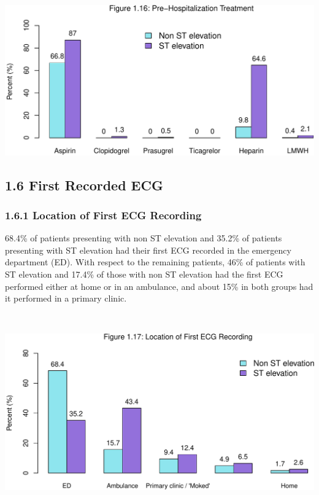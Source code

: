 \documentclass[
]{article}
\begin{document}
\includegraphics{ACSIS_2024_v1_pdf_files/figure-latex/unnamed-chunk-54-1.pdf}

\pagebreak

\subsection{1.6 First Recorded ECG}\label{first-recorded-ecg}

\subsubsection{1.6.1 Location of First ECG
Recording}\label{location-of-first-ecg-recording}

68.4\% of patients presenting with non ST elevation and 35.2\% of
patients presenting with ST elevation had their first ECG recorded in
the emergency department (ED). With respect to the remaining patients,
46\% of patients with ST elevation and 17.4\% of those with non ST
elevation had the first ECG performed either at home or in an ambulance,
and about 15\% in both groups had it performed in a primary clinic.

~

\includegraphics{ACSIS_2024_v1_pdf_files/figure-latex/unnamed-chunk-55-1.pdf}
\end{document}
